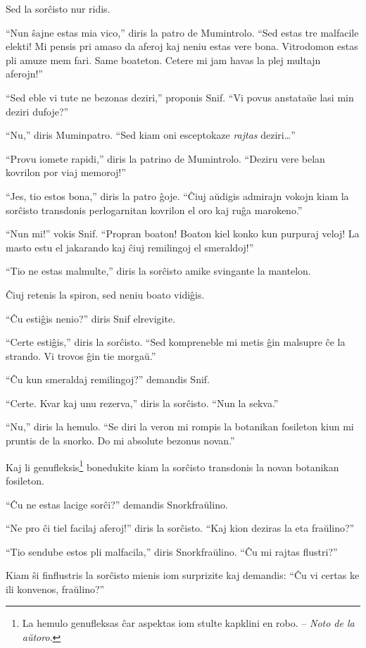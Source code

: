 Sed la sorĉisto nur ridis.

``Nun ŝajne estas mia vico,'' diris la patro de Mumintrolo. ``Sed estas tre malfacile elekti! Mi pensis pri amaso da aferoj kaj neniu estas vere bona. Vitrodomon estas pli amuze mem fari. Same boateton. Cetere mi jam havas la plej multajn aferojn!''

``Sed eble vi tute ne bezonas deziri,'' proponis Snif. ``Vi povus anstataŭe lasi min deziri dufoje?''

``Nu,'' diris Muminpatro. ``Sed kiam oni esceptokaze \emph{rajtas} deziri{\ldots}''

``Provu iomete rapidi,'' diris la patrino de Mumintrolo. ``Deziru vere belan kovrilon por viaj memoroj!''

``Jes, tio estos bona,'' diris la patro ĝoje. ``Ĉiuj aŭdigis admirajn vokojn kiam la sorĉisto transdonis perlogarnitan kovrilon el oro kaj ruĝa marokeno.''

``Nun mi!'' vokis Snif. ``Propran boaton! Boaton kiel konko kun purpuraj veloj! La masto estu el jakarando kaj ĉiuj remilingoj el smeraldoj!''

``Tio ne estas malmulte,'' diris la sorĉisto amike svingante la mantelon.

Ĉiuj retenis la spiron, sed neniu boato vidiĝis.

``Ĉu estiĝis nenio?'' diris Snif elrevigite.

``Certe estiĝis,'' diris la sorĉisto. ``Sed kompreneble mi metis ĝin malsupre ĉe la strando. Vi trovos ĝin tie morgaŭ.''

``Ĉu kun smeraldaj remilingoj?'' demandis Snif.

``Certe. Kvar kaj unu rezerva,'' diris la sorĉisto. ``Nun la sekva.''

``Nu,'' diris la hemulo. ``Se diri la veron mi rompis la botanikan fosileton kiun mi pruntis de la snorko. Do mi absolute bezonus novan.''

Kaj li genufleksis\footnote{La hemulo genufleksas ĉar aspektas iom stulte kapklini en robo. -- \emph{Noto de la aŭtoro}.} bonedukite kiam la sorĉisto transdonis la novan botanikan fosileton.

``Ĉu ne estas lacige sorĉi?'' demandis Snorkfraŭlino.

``Ne pro ĉi tiel facilaj aferoj!'' diris la sorĉisto. ``Kaj kion deziras la eta fraŭlino?''

``Tio sendube estos pli malfacila,'' diris Snorkfraŭlino. ``Ĉu mi rajtas flustri?''

Kiam ŝi finflustris la sorĉisto mienis iom surprizite kaj demandis: ``Ĉu vi certas ke ili konvenos, fraŭlino?''

